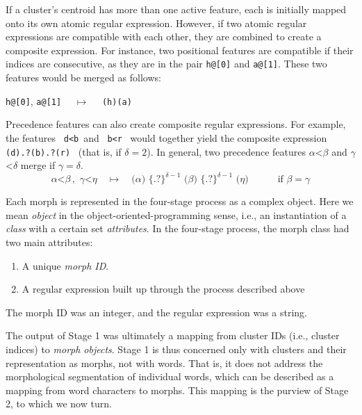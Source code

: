If a cluster's centroid has more than one active feature, each
is initially mapped onto its own atomic regular expression.
However, if two atomic regular expressions are compatible with each other, %
they are combined to create a composite expression. For instance, two 
positional features are compatible if their indices are consecutive, 
as they are in the pair \texttt{h@[0]} and \texttt{a@[1]}. These two features would be
merged as follows: 
\begin{centering}
\texttt{h@[0]}, \texttt{a@[1]} $\quad \mapsto \quad$ \texttt{(h)(a)}
\end{centering}
Precedence features 
can also create composite regular expressions. For example, the 
features \, \texttt{d<b}\,  and \, \texttt{b<r} \, would together yield the 
composite expression \, \texttt{(d).?(b).?(r)} \, (that is, if $\delta = 2$). 
In general, two precedence features $\alpha$<$\beta$ and $\gamma$<$\delta$
merge if $\gamma=\delta$.
\begin{equation}
\alpha\texttt{<} \beta \, ,\,\, \gamma \texttt{<} \eta  \quad \mapsto \quad \texttt{(} \alpha \texttt{)}  \,\, 
{\{\texttt{.?}\}}^{\delta-1} \,\, \texttt{(}\beta \texttt{)} \,\,{\{\texttt{.?}\}}^{\delta-1} \, \, \texttt{(} \eta \texttt{)} \qquad \quad \text{if $\beta = \gamma$} 
\end{equation}

Each morph is represented in the four-stage process as a complex object. Here 
we mean \emph{object} in the object-oriented-programming sense, i.e., an instantiation of a \emph{class} with a certain set \emph{attributes}.
In the four-stage process, the morph class had two main attributes:
\begin{enumerate}
\item A unique \emph{morph ID}.
\item A regular expression built up through the process described above
\end{enumerate}
The morph ID was an integer, and the regular expression was a string.

The output of Stage 1 was ultimately a mapping from cluster IDs (i.e., cluster indices) to \emph{morph objects}.
Stage 1 is thus concerned only with clusters and their representation as morphs, not with words. That is,
it does not address the morphological segmentation of individual words, which can
be described as a mapping from word characters to morphs. This mapping is the purview of Stage 2,
to which we now turn.


